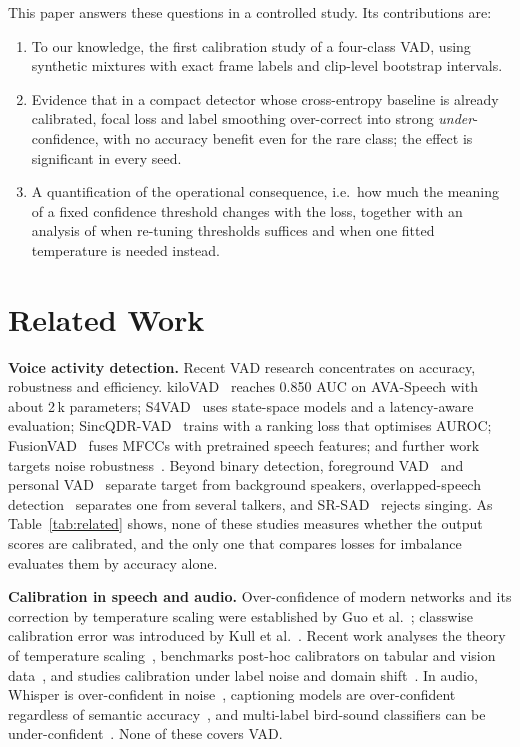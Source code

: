 \documentclass[conference]{IEEEtran}
\begin{document}
This paper answers these questions in a controlled study. Its contributions are:
\begin{enumerate}
\item To our knowledge, the first calibration study of a four-class VAD, using synthetic mixtures with exact frame labels and clip-level bootstrap intervals.
\item Evidence that in a compact detector whose cross-entropy baseline is already calibrated, focal loss and label smoothing over-correct into strong \emph{under}-confidence, with no accuracy benefit even for the rare class; the effect is significant in every seed.
\item A quantification of the operational consequence, i.e.\ how much the meaning of a fixed confidence threshold changes with the loss, together with an analysis of when re-tuning thresholds suffices and when one fitted temperature is needed instead.
\end{enumerate}

\section{Related Work}\label{sec:related}

\textbf{Voice activity detection.} Recent VAD research concentrates on accuracy, robustness and efficiency. kiloVAD~\cite{bauer2026kilovad} reaches 0.850 AUC on AVA-Speech with about 2\,k parameters; S4VAD~\cite{cohen2026s4vad} uses state-space models and a latency-aware evaluation; SincQDR-VAD~\cite{wang2025sincqdr} trains with a ranking loss that optimises AUROC; FusionVAD~\cite{tripathi2025fusionvad} fuses MFCCs with pretrained speech features; and further work targets noise robustness~\cite{jafarzadeh2025tinyvad,bovbjerg2025tsvad}. Beyond binary detection, foreground VAD~\cite{yang2026fvad} and personal VAD~\cite{ding2020personalvad,yeh2025pvad} separate target from background speakers, overlapped-speech detection~\cite{sun2025osd} separates one from several talkers, and SR-SAD~\cite{grundhuber2025srsad} rejects singing. As Table~\ref{tab:related} shows, none of these studies measures whether the output scores are calibrated, and the only one that compares losses for imbalance~\cite{yeh2025pvad} evaluates them by accuracy alone.

\textbf{Calibration in speech and audio.} Over-confidence of modern networks and its correction by temperature scaling were established by Guo et al.~\cite{guo2017calibration}; classwise calibration error was introduced by Kull et al.~\cite{kull2019dirichlet}. Recent work analyses the theory of temperature scaling~\cite{mattei2026welltempered}, benchmarks post-hoc calibrators on tabular and vision data~\cite{berta2026calarena}, and studies calibration under label noise and domain shift~\cite{penso2026thesis}. In audio, Whisper is over-confident in noise~\cite{huo2025overconfidence}, captioning models are over-confident regardless of semantic accuracy~\cite{dunker2025aac}, and multi-label bird-sound classifiers can be under-confident~\cite{schwinger2026bird}. None of these covers VAD.
\end{document}
